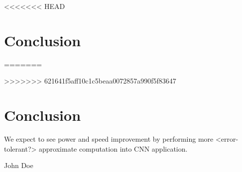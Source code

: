 \documentclass[conference]{IEEEtran}
\begin{document}
<<<<<<< HEAD
\section{Conclusion}
\blindtext
=======

>>>>>>> 621641f5aff10c1c5beaa0072857a990f5f83647



\section{Conclusion}
We expect to see power and speed improvement by performing more <error-tolerant?> approximate computation into CNN application.


\ifCLASSOPTIONcaptionsoff
  \newpage
\fi


\begin{IEEEbiography}{John Doe}
\blindtext
\end{IEEEbiography}
\end{document}
